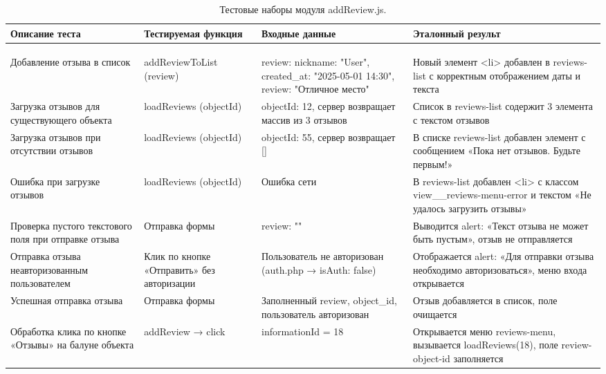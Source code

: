 \renewcommand{\arraystretch}{0.8} %
\begin{xltabular}{\textwidth}{|X|X|X|X|}
	\caption{Тестовые наборы модуля addReview.js.\label{class:mtable3}}\\
	\hline \centrow Описание теста & \centrow Тестируемая функция & \centrow Входные данные & \centrow Эталонный результ\\
	\hline {} &  &  & \\ \hline
	\endfirsthead
	\\
	\hline {} &  &  & \\ \hline
	\finishhead
	Добавление отзыва в список & addReviewToList (review) & review: nickname: "User", created\_at: "2025-05-01 14:30", review: "Отличное место" & Новый элемент <li> добавлен в reviews-list с корректным отображением даты и текста\\
	\hline Загрузка отзывов для существующего объекта & loadReviews (objectId) & objectId: 12, сервер возвращает массив из 3 отзывов & Список в reviews-list содержит 3 элемента с текстом отзывов\\
	\hline Загрузка отзывов при отсутствии отзывов & loadReviews (objectId) & objectId: 55, сервер возвращает [] & В списке reviews-list добавлен элемент с сообщением «Пока нет отзывов. Будьте первым!»\\
	\hline Ошибка при загрузке отзывов & loadReviews (objectId) & Ошибка сети & В reviews-list добавлен <li> с классом view\_\_reviews-menu-error и текстом «Не удалось загрузить отзывы»\\
	\hline Проверка пустого текстового поля при отправке отзыва & Отправка формы & review: "" & Выводится alert: «Текст отзыва не может быть пустым», отзыв не отправляется\\
	\hline Отправка отзыва неавторизованным пользователем & Клик по кнопке «Отправить» без авторизации & Пользователь не авторизован (auth.php → isAuth: false) & Отображается alert: «Для отправки отзыва необходимо авторизоваться», меню входа открывается\\
	\hline Успешная отправка отзыва & Отправка формы & Заполненный review, object\_id, пользователь авторизован & Отзыв добавляется в список, поле очищается\\
	\hline Обработка клика по кнопке «Отзывы» на балуне объекта & addReview → click & informationId = 18 & Открывается меню reviews-menu, вызывается loadReviews(18), поле review-object-id заполняется\\
\end{xltabular}

